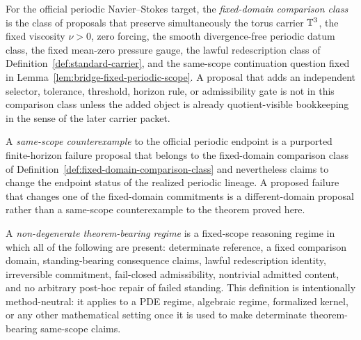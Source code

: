\begin{manualdefinition}
\label{def:fixed-domain-comparison-class}
For the official periodic Navier--Stokes target, the \emph{fixed-domain comparison class} is the class of proposals that preserve simultaneously the torus carrier $\mathbb{T}^3$, the fixed viscosity $\nu>0$, zero forcing, the smooth divergence-free periodic datum class, the fixed mean-zero pressure gauge, the lawful redescription class of Definition~\ref{def:standard-carrier}, and the same-scope continuation question fixed in Lemma~\ref{lem:bridge-fixed-periodic-scope}. A proposal that adds an independent selector, tolerance, threshold, horizon rule, or admissibility gate is not in this comparison class unless the added object is already quotient-visible bookkeeping in the sense of the later carrier packet.
\end{manualdefinition}

\begin{manualdefinition}
\label{def:same-scope-counterexample-fixed-domain}
A \emph{same-scope counterexample} to the official periodic endpoint is a purported finite-horizon failure proposal that belongs to the fixed-domain comparison class of Definition~\ref{def:fixed-domain-comparison-class} and nevertheless claims to change the endpoint status of the realized periodic lineage. A proposed failure that changes one of the fixed-domain commitments is a different-domain proposal rather than a same-scope counterexample to the theorem proved here.
\end{manualdefinition}


\begin{manualdefinition}
\label{def:nondegenerate-theorem-bearing-regime}
A \emph{non-degenerate theorem-bearing regime} is a fixed-scope reasoning regime in which all of the following are present: determinate reference, a fixed comparison domain, standing-bearing consequence claims, lawful redescription identity, irreversible commitment, fail-closed admissibility, nontrivial admitted content, and no arbitrary post-hoc repair of failed standing. This definition is intentionally method-neutral: it applies to a PDE regime, algebraic regime, formalized kernel, or any other mathematical setting once it is used to make determinate theorem-bearing same-scope claims.
\end{manualdefinition}

